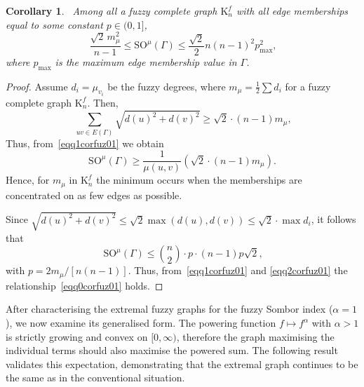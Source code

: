 \documentclass[12pt]{amsart}
\newtheorem{corollary}[theorem]{Corollary}
\newcommand{\SOG}{\mathrm{SO}^{\mu}}
\newcommand{\KK}{\mathrm{K}}
\begin{document}
\begin{corollary}~\label{corfuzzy003}
Among all a fuzzy complete graph $\KK_n^f$ with all edge memberships equal to some constant $p \in (0,1]$, 
\begin{equation}~\label{eqq0corfuz01}
\frac{\sqrt{2} \, m_{\mu}^2}{n-1} \leqslant \SOG(\Gamma) \leqslant \frac{\sqrt{2}}{2} n(n-1)^2 p_{\max}^2,
\end{equation}
where $p_{\max}$ is the maximum edge membership value in $\Gamma$. 
\end{corollary}
\begin{proof}
Assume $d_i=\mu_{v_i}$ be the fuzzy degrees, where $m_{\mu} = \frac{1}{2} \sum d_i$ for a fuzzy complete graph $\KK_n^f$. Then, 
\begin{equation}~\label{eqq1corfuz01}
\sum_{uv\in E(\Gamma)} \sqrt{d(u)^2+d(v)^2} \geqslant \sqrt{2} \cdot (n-1) m_{\mu},
\end{equation}
Thus, from~\eqref{eqq1corfuz01} we obtain 
\[
\SOG(\Gamma)\geqslant  \frac{1}{\mu(u,v)}\left(\sqrt{2} \cdot (n-1) m_{\mu}\right).
\]
Hence, for $m_{\mu}$ in $\KK_n^f$ the minimum occurs when the memberships are concentrated on as few edges as possible.

Since $\sqrt{d(u)^2+d(v)^2} \leqslant \sqrt{2} \max(d(u),d(v)) \leqslant \sqrt{2} \cdot \max d_i$, it follows that
\begin{equation}~\label{eqq2corfuz01}
  \SOG(\Gamma) \leqslant \binom{n}{2} \cdot p \cdot (n-1)p \sqrt{2},  
\end{equation}
with $p = 2m_{\mu}/[n(n-1)]$. Thus, from~\eqref{eqq1corfuz01} and \eqref{eqq2corfuz01} the relationship~\eqref{eqq0corfuz01} holds.
\end{proof}
 

After characterising the extremal fuzzy graphs for the fuzzy Sombor index ($\alpha=1$), we now examine its generalised form. The powering function $f \mapsto f^{\alpha}$ with $\alpha>1$ is strictly growing and convex on $[0,\infty)$, therefore the graph maximising the individual terms should also maximise the powered sum. The following result validates this expectation, demonstrating that the extremal graph continues to be the same as in the conventional situation.
\end{document}
